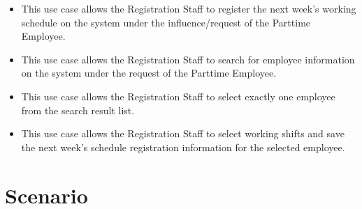 \begin{itemize}
    \item This use case allows the Registration Staff to register the next week's working schedule on the system under the influence/request of the Parttime Employee.

    \item This use case allows the Registration Staff to search for employee information on the system under the request of the Parttime Employee.

    \item This use case allows the Registration Staff to select exactly one employee from the search result list.

    \item This use case allows the Registration Staff to select working shifts and save the next week's schedule registration information for the selected employee.
\end{itemize}

\section{Scenario}

